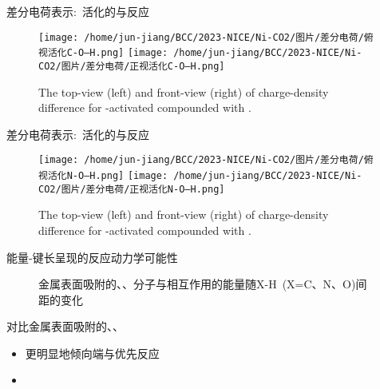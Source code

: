 \begin{frame}[allowframebreaks]
差分电荷表示:~活化的\textrm{}与\textrm{}反应
\begin{figure}[h!]
\centering
\texttt{[image: /home/jun-jiang/BCC/2023-NICE/Ni-CO2/图片/差分电荷/俯视活化C-O---H.png]}
\texttt{[image: /home/jun-jiang/BCC/2023-NICE/Ni-CO2/图片/差分电荷/正视活化C-O---H.png]}
\caption{\tiny \textrm{The top-view (left) and front-view (right) of charge-density difference for -activated compounded with .}}%
\label{Charge-density_difference:CO}
\end{figure}
差分电荷表示:~活化的\textrm{}与\textrm{}反应
\begin{figure}[h!]
\centering
\texttt{[image: /home/jun-jiang/BCC/2023-NICE/Ni-CO2/图片/差分电荷/俯视活化N-O---H.png]}
\texttt{[image: /home/jun-jiang/BCC/2023-NICE/Ni-CO2/图片/差分电荷/正视活化N-O---H.png]}
\caption{\tiny \textrm{The top-view (left) and front-view (right) of charge-density difference for -activated compounded with .}}%
\label{Charge-density_difference:NO}
\end{figure}
能量-键长呈现的反应动力学可能性
\begin{figure}[h!]
\centering
\caption{\tiny 金属表面吸附的\textrm{、、}分子与\textrm{}相互作用的能量随\textrm{X-H~(X=C、N、O)}间距的变化}%
\label{X-H_E}
\end{figure}
\newpage
对比金属表面吸附的\textrm{}、\textrm{}、\textrm{}
\begin{itemize}
	\item \textrm{}更明显地倾向\textrm{}端与\textrm{}优先反应
	\item \textrm{}
\end{itemize}

\end{frame}
